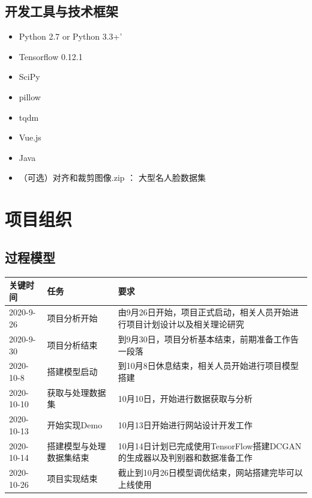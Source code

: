 \documentclass[
  hyperref, a4paper]{ctexart}
\begin{document}
\hypertarget{ux5f00ux53d1ux5de5ux5177ux4e0eux6280ux672fux6846ux67b6}{%
\subsection{开发工具与技术框架}\label{ux5f00ux53d1ux5de5ux5177ux4e0eux6280ux672fux6846ux67b6}}

\begin{itemize}
\item
  Python 2.7 or Python 3.3+'
\item
  Tensorflow 0.12.1
\item
  SciPy
\item
  pillow
\item
  tqdm
\item
  Vue.js
\item
  Java
\item
  （可选）对齐和裁剪图像.zip ： 大型名人脸数据集
\end{itemize}

\hypertarget{ux9879ux76eeux7ec4ux7ec7}{%
\section{项目组织}\label{ux9879ux76eeux7ec4ux7ec7}}

\hypertarget{ux8fc7ux7a0bux6a21ux578b}{%
\subsection{过程模型}\label{ux8fc7ux7a0bux6a21ux578b}}

\begin{table}[H]
\small 
\begin{center}  
\begin{tabular}{|p{1.5cm}|p{3cm}|p{5cm}|}  
\hline  
 关键时间 & 任务 & 要求  \\ \hline  
2020-9-26 & 项目分析开始 & 由9月26日开始，项目正式启动，相关人员开始进行项目计划设计以及相关理论研究\\  \hline
2020-9-30 & 项目分析结束 & 到9月30日，项目分析基本结束，前期准备工作告一段落\\  \hline
2020-10-8 & 搭建模型启动 & 到10月8日休息结束，相关人员开始进行项目模型搭建\\  \hline
2020-10-10 & 获取与处理数据集& 10月10日，开始进行数据获取与分析 \\  \hline  
2020-10-13 & 开始实现Demo& 10月13日开始进行网站设计开发工作 \\  \hline  
2020-10-14 & 搭建模型与处理数据集结束& 10月14日计划已完成使用TensorFlow搭建DCGAN的生成器以及判别器和数据准备工作 \\  \hline  
2020-10-26 & 项目实现结束 & 截止到10月26日模型调优结束，网站搭建完毕可以上线使用 \\ \hline  
\end{tabular}  
\end{center}  
\end{table}
\end{document}
